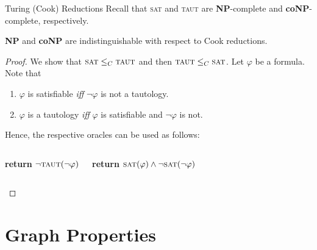 \documentclass[10pt,aspectratio=169,english]{beamer}
\begin{document}
\begin{frame}{Turing (Cook) Reductions}
Recall that \textsc{sat} and \textsc{taut} are \textbf{NP}-complete and \textbf{coNP}-complete, respectively.
\begin{theorem}
\textbf{NP} and \textbf{coNP} are indistinguishable with respect to Cook reductions.
\end{theorem}
\begin{proof}[Proof\nopunct]
We show that $\textsc{sat} \leq_C \textsc{taut}$ and then $\textsc{taut} \leq_C \textsc{sat}$. Let $\varphi$ be a formula. Note that
\begin{enumerate}
	\item $\varphi$ is satisfiable \textit{iff} $\neg \varphi$ is not a tautology.
	
	\item $\varphi$ is a tautology \textit{iff} $\varphi$ is satisfiable and $\neg\varphi$ is not.
\end{enumerate}
Hence, the respective oracles can be used as follows:
\begin{columns}[T,onlytextwidth]
\begin{algorithmic}[1]
            \State \textbf{return} $\neg \textsc{taut}(\neg \varphi)$
        \EndProcedure
    \end{algorithmic}
	\begin{algorithmic}[1]
            \State \textbf{return} $\textsc{sat}(\varphi) \land \neg \textsc{sat}(\neg \varphi)$
        \EndProcedure {\qedhere\text{\,\,}}
    \end{algorithmic}
    \end{columns}
\end{proof}
\end{frame}




\section{Graph Properties}
\end{document}
